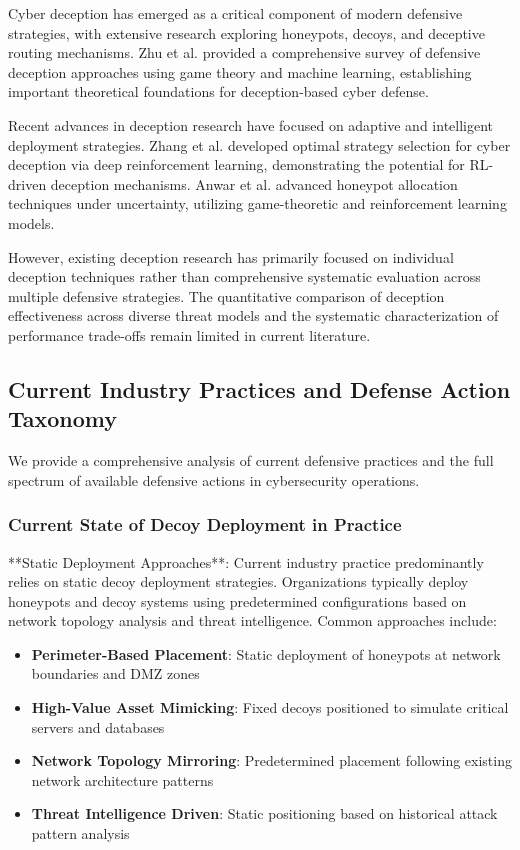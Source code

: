 \documentclass[12pt,twoside]{article}
\theoremstyle{definition}
\theoremstyle{plain}
\begin{document}
Cyber deception has emerged as a critical component of modern defensive strategies, with extensive research exploring honeypots, decoys, and deceptive routing mechanisms. Zhu et al. \cite{zhu2021survey} provided a comprehensive survey of defensive deception approaches using game theory and machine learning, establishing important theoretical foundations for deception-based cyber defense.

Recent advances in deception research have focused on adaptive and intelligent deployment strategies. Zhang et al. \cite{zhang2022optimal} developed optimal strategy selection for cyber deception via deep reinforcement learning, demonstrating the potential for RL-driven deception mechanisms. Anwar et al. \cite{anwar2022honeypot} advanced honeypot allocation techniques under uncertainty, utilizing game-theoretic and reinforcement learning models.

However, existing deception research has primarily focused on individual deception techniques rather than comprehensive systematic evaluation across multiple defensive strategies. The quantitative comparison of deception effectiveness across diverse threat models and the systematic characterization of performance trade-offs remain limited in current literature.

\subsection{Current Industry Practices and Defense Action Taxonomy}

We provide a comprehensive analysis of current defensive practices and the full spectrum of available defensive actions in cybersecurity operations.

\subsubsection{Current State of Decoy Deployment in Practice}

**Static Deployment Approaches**: Current industry practice predominantly relies on static decoy deployment strategies. Organizations typically deploy honeypots and decoy systems using predetermined configurations based on network topology analysis and threat intelligence. Common approaches include:

\begin{itemize}
\item \textbf{Perimeter-Based Placement}: Static deployment of honeypots at network boundaries and DMZ zones
\item \textbf{High-Value Asset Mimicking}: Fixed decoys positioned to simulate critical servers and databases  
\item \textbf{Network Topology Mirroring}: Predetermined placement following existing network architecture patterns
\item \textbf{Threat Intelligence Driven}: Static positioning based on historical attack pattern analysis
\end{itemize}
\end{document}

